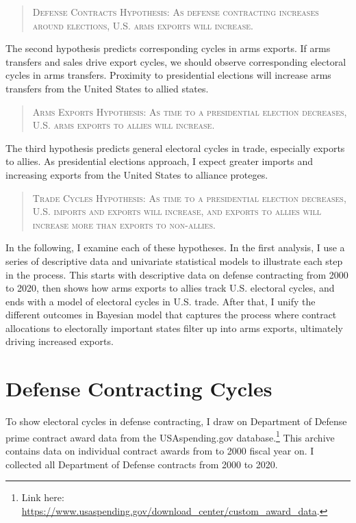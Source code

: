 \documentclass[12pt]{article}
\begin{document}
\begin{quote}
\textsc{Defense Contracts Hypothesis: As defense contracting increases around elections, U.S. arms exports will increase.}
\end{quote}


The second hypothesis predicts corresponding cycles in arms exports.
If arms transfers and sales drive export cycles, we should observe corresponding electoral cycles in arms transfers.
Proximity to presidential elections will increase arms transfers from the United States to allied states. 


\begin{quote}
\textsc{Arms Exports Hypothesis: As time to a presidential election decreases, U.S. arms exports to allies will increase.}
\end{quote}


The third hypothesis predicts general electoral cycles in trade, especially exports to allies. 
As presidential elections approach, I expect greater imports and increasing exports from the United States to alliance proteges.


\begin{quote}
\textsc{Trade Cycles Hypothesis: As time to a presidential election decreases, U.S. imports and exports will increase, and exports to allies will increase more than exports to non-allies.}
\end{quote}



In the following, I examine each of these hypotheses. 
In the first analysis, I use a series of descriptive data and univariate statistical models to illustrate each step in the process.
This starts with descriptive data on defense contracting from 2000 to 2020, then shows how arms exports to allies track U.S. electoral cycles, and ends with a model of electoral cycles in U.S. trade. 
After that, I unify the different outcomes in Bayesian model that captures the process where contract allocations to electorally important states filter up into arms exports, ultimately driving increased exports.


\section{Defense Contracting Cycles}


To show electoral cycles in defense contracting, I draw on Department of Defense prime contract award data from the USAspending.gov database.\footnote{Link here: \url{https://www.usaspending.gov/download_center/custom_award_data}.} 
This archive contains data on individual contract awards from to 2000 fiscal year on.
I collected all Department of Defense contracts from 2000 to 2020.
\end{document}
